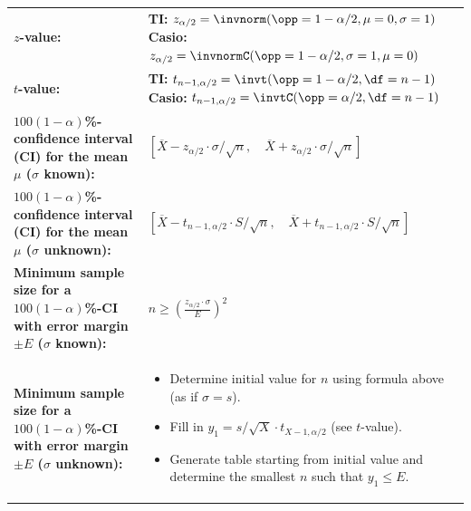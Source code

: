 \documentclass[11pt,a4paper,english]{article} %
\begin{document}
\begin{center}
    \begin{tabular}{m{}C{0.5\textwidth}}
        \textbf{$z$-value:}  & \textbf{TI:} $z_{\alpha/2} = \invnorm(\opp=1-\alpha/2, \mu=0, \sigma=1)$ \newline \textbf{Casio:} $z_{\alpha/2} = \invnormC(\opp=1-\alpha/2, \sigma=1,\mu=0)$ \\
        \textbf{$t$-value:}  & \textbf{TI:} $t_{n-1,\alpha/2} = \invt(\opp=1-\alpha/2, \df=n-1)$ \newline \textbf{Casio:} $t_{n-1,\alpha/2} = \invtC(\opp=\alpha/2, \df=n-1)$ \\
        \textbf{$100(1-\alpha)$\si{\percent}-confidence interval (CI) for the mean $\mu$ ($\sigma$ known):} & $[\overline{X} - z_{\alpha/2} \cdot \sigma / \sqrt{n}, \quad  \overline{X} + z_{\alpha/2} \cdot \sigma / \sqrt{n}]$ \\
        \textbf{$100(1-\alpha)$\si{\percent}-confidence interval (CI) for the mean $\mu$ ($\sigma$ unknown):} & $[\overline{X} - t_{n-1,\alpha/2} \cdot S / \sqrt{n}, \quad  \overline{X} + t_{n-1,\alpha/2} \cdot S / \sqrt{n}]$ \\
        \textbf{Minimum sample size for a \newline \textbf{$100(1-\alpha)$\si{\percent}-CI with error margin $\pm E$ \newline ($\sigma$ known):}} & $n \geq \left(\frac{z_{\alpha/2}\cdot \sigma}{E}\right)^2$ \\
        \textbf{Minimum sample size for a \newline \textbf{$100(1-\alpha)$\si{\percent}-CI with error margin $\pm E$ \newline ($\sigma$ unknown):}} &
        \begin{itemize} 
            \item Determine initial value for $n$ using formula above (as if $\sigma = s$).
            \item Fill in $y_1 = s / \sqrt{X} \cdot t_{X-1, \alpha/2}$ (see $t$-value). 
            \item Generate table starting from initial value and determine the smallest $n$ such that $y_1 \leq E$. 
        \end{itemize} \\
    \end{tabular}  
\end{center}

\newpage
\end{document}
